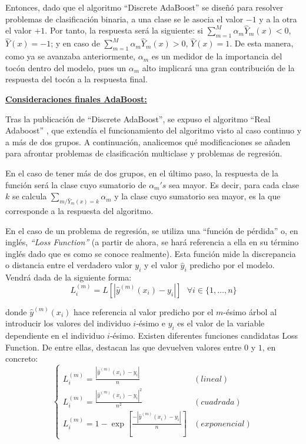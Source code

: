 \documentclass[12pt,twoside]{article}
\begin{document}
Entonces, dado que el algoritmo ``Discrete AdaBoost'' se diseñó para resolver problemas de clasificación binaria, a una clase se le asocia el valor $-1$ y a la otra el valor $+1$. Por tanto, la respuesta será la siguiente: si $\sum_{m=1}^M \alpha_m \hat{Y}_m(x) < 0$, $\hat{Y}(x) = - 1$; y en caso de $\sum_{m=1}^M \alpha_m \hat{Y}_m(x) > 0$, $\hat{Y}(x) = 1$. De esta manera, como ya se avanzaba anteriormente, $\alpha_m$ es un medidor de la importancia del tocón dentro del modelo, pues un $\alpha_m$ alto implicará una gran contribución de la respuesta del tocón a la respuesta final.

\bigskip

\textbf{\underline{Consideraciones finales AdaBoost:}}

Tras la publicación de ``Discrete AdaBoost'', se expuso el algoritmo ``Real Adaboost'' \cite{FR02}, que extendía el funcionamiento del algoritmo visto al caso continuo y a más de dos grupos. A continuación, analicemos qué modificaciones se añaden para afrontar problemas de clasificación multiclase y problemas de regresión.

En el caso de tener más de dos grupos, en el último paso, la respuesta de la función será la clase cuyo sumatorio de $\alpha_m's$ sea mayor. Es decir, para cada clase $k$ se calcula $\sum_{m / \hat{Y}_m(x) = k} \alpha_m$ y la clase cuyo sumatorio sea mayor, es la que corresponde a la respuesta del algoritmo.

En el caso de un problema de regresión, se utiliza una ``función de pérdida'' o, en inglés, \textit{``Loss Function''} (a partir de ahora, se hará referencia a ella en su término inglés dado que es como se conoce realmente). Esta función mide la discrepancia o distancia entre el verdadero valor $y_i$ y el valor $\hat{y}_i$ predicho por el modelo. Vendrá dada de la siguiente forma:
\begin{equation*}
L_i^{(m)} = L \left[ |\hat{y}^{(m)}(x_i) - y_i| \right] \, \, \, \, \forall i \in \{ 1, \dots, n \}
\end{equation*}

\noindent
donde $\hat{y}^{(m)}(x_i)$ hace referencia al valor predicho por el $m$-ésimo árbol al introducir los valores del individuo $i$-ésimo e $y_i$ es el valor de la variable dependiente en el individuo $i$-ésimo. Existen diferentes funciones candidatas Loss Function. De entre ellas, destacan las que devuelven valores entre $0$ y $1$, en concreto:
\begin{equation*}
\left\{
\begin{array}{cl}
L_i^{(m)} = \frac{|\hat{y}^{(m)}(x_i) - y_i|}{n} &  (lineal) \\ 
L_i^{(m)} = \frac{|\hat{y}^{(m)}(x_i) - y_i|^2}{n^2} & (cuadrada) \\
L_i^{(m)} = 1 - \exp \left[ \frac{-|\hat{y}^{(m)}(x_i) - y_i|}{n} \right] & (exponencial)
\end{array}
\right.
\end{equation*}
\end{document}
